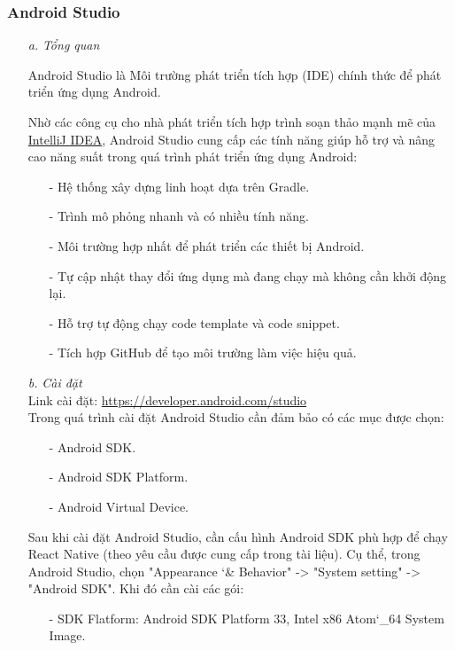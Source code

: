 \subsubsection{Android Studio}
\begin{enumerate}
    \item[\textit{a.}] {\textit{Tổng quan}}

    Android Studio là Môi trường phát triển tích hợp (IDE) chính thức để phát triển ứng dụng Android.

    Nhờ các công cụ cho nhà phát triển tích hợp trình soạn thảo mạnh mẽ của  \href{https://www.jetbrains.com/idea/}{IntelliJ IDEA}, Android Studio cung cấp các tính năng giúp hỗ trợ và nâng cao năng suất trong quá trình phát triển ứng dụng Android:
    \begin{enumerate}
        \item[-] Hệ thống xây dựng linh hoạt dựa trên Gradle.
        \item[-] Trình mô phỏng nhanh và có nhiều tính năng.
        \item[-] Môi trường hợp nhất để phát triển các thiết bị Android.
        \item[-] Tự cập nhật thay đổi ứng dụng mà đang chạy mà không cần khởi động lại.
        \item[-] Hỗ trợ tự động chạy code template và code snippet.
        \item[-] Tích hợp GitHub để tạo môi trường làm việc hiệu quả.
    \end{enumerate}
    \item[\textit{b.}] {\textit{Cài đặt}}\\
    Link cài đặt: \url{https://developer.android.com/studio}\\
    Trong quá trình cài đặt Android Studio cần đảm bảo có các mục được chọn:
    \begin{enumerate}
        \item[-] Android SDK.
        \item[-] Android SDK Platform.
        \item[-] Android Virtual Device.
    \end{enumerate}
    Sau khi cài đặt Android Studio, cần cấu hình Android SDK phù hợp để chạy React Native (theo yêu cầu được cung cấp trong tài liệu). Cụ thể, trong Android Studio, chọn "Appearance \char`& Behavior" -> "System setting" -> "Android SDK". Khi đó cần cài các gói:
    \begin{enumerate}
        \item[-] SDK Flatform: Android SDK Platform 33, Intel x86 Atom\char`_64 System Image.

\end{enumerate}
\end{enumerate}
